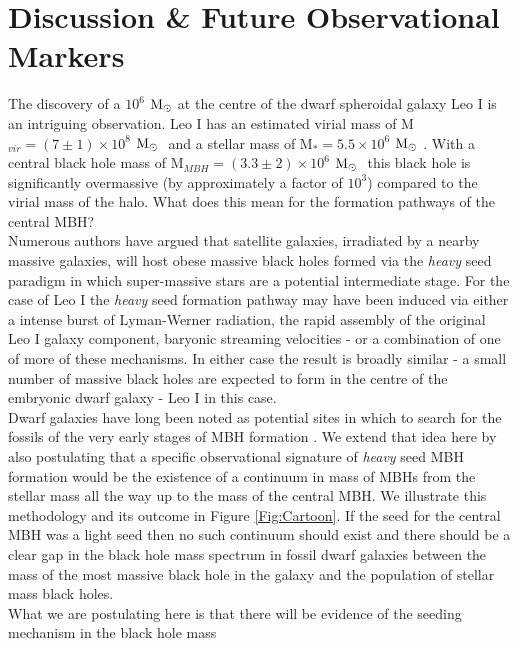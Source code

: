 \documentclass[twocolumn, tighten]{aastex631}
\newcommand{\msolar} {$\rm{M_{\odot}}~$}
\begin{document}
\section{Discussion \& Future Observational Markers} \label{Sec:Discussion}
\noindent The discovery of a $10^6$ \msolar at the centre of the dwarf spheroidal galaxy Leo I is an intriguing
observation. Leo I has an estimated virial mass of M$_{vir} = (7 \pm 1) \times 10^8$ \msolar \citep{McConnachie_2012} and a stellar mass of M$_{*} = 5.5 \times 10^6$ \msolar \citep{Mateo_2008}. 
With a central black hole mass of M$_{MBH} = (3.3 \pm 2) \times 10^6$ \msolar \citep{Bustamante-Rosell_2021} this black hole is significantly overmassive (by approximately a factor of $10^3$) compared to the virial mass of the halo. What does this mean for the 
formation pathways of the central MBH?\\
\indent Numerous authors have argued that satellite galaxies, irradiated by a nearby massive galaxies, will host obese 
massive black holes \citep{Agarwal_2013, Natarajan_2017, Scoggins_2022} formed via the \textit{heavy} seed paradigm in which
super-massive stars are a potential intermediate stage. For the case of Leo I the \textit{heavy} seed formation pathway
may have been induced via either a intense burst of Lyman-Werner radiation, the rapid assembly of 
the original Leo I galaxy component, baryonic streaming velocities - or a combination of 
one of more of these mechanisms. In either case the result is broadly similar - a small number 
of massive black holes are expected to form in the centre of the embryonic dwarf galaxy - Leo I in this case. \\
\indent Dwarf galaxies have long been noted as potential sites in which to search for the fossils 
of the very early stages of MBH formation \citep{Volonteri_2008, VanWassenhove_2010}. We 
extend that idea here by also postulating that a specific observational signature of \textit{heavy} seed
MBH formation would be the existence of a continuum in mass of MBHs from the stellar mass all the way up to the mass of the central MBH. 
We illustrate this methodology and its outcome in Figure \ref{Fig:Cartoon}. If the seed for the central MBH was a light seed then no such continuum should exist
and there should be a clear gap in the black hole mass spectrum in fossil dwarf galaxies between the mass of the most massive black hole in the galaxy and the 
population of stellar mass black holes. \\
\indent What we are postulating here is that there will be evidence of the seeding mechanism in the black hole mass 
\end{document}
